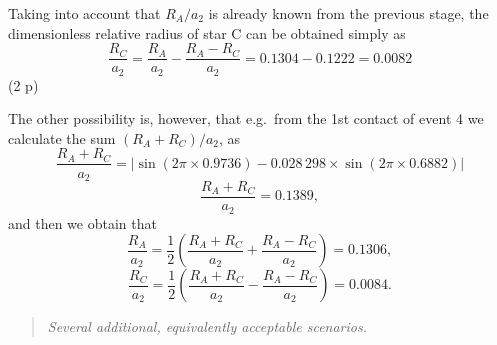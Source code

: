 \begin{description}
\begin{description}
    Taking into account that $R_A/a_2$ is already known from the previous
    stage, the dimensionless relative radius of star C can be obtained
    simply as
    \[ \frac{R_C}{a_2} = \frac{R_A}{a_2} - \frac{R_A - R_C}{a_2}
       = 0.1304 - 0.1222 = 0.0082
       \tag*{(2.22)} \]
    \hfill(2 p)

    The other possibility is, however, that e.g.\ from the 1st contact of
    event 4 we calculate the sum $(R_A + R_C)/a_2$, as
    \[ \frac{R_A + R_C}{a_2}
       = \left| \sin(2\pi \times 0.9736)
       - 0.028\,298 \times \sin(2\pi \times 0.6882) \right|
       \tag*{(2.23)} \]
    \[ \frac{R_A + R_C}{a_2} = 0.1389,
       \tag*{(2.24)} \]
    and then we obtain that
    \[ \frac{R_A}{a_2} = \frac{1}{2}\left( \frac{R_A + R_C}{a_2}
       + \frac{R_A - R_C}{a_2} \right) = 0.1306,
       \tag*{(2.25)} \]
    \[ \frac{R_C}{a_2} = \frac{1}{2}\left( \frac{R_A + R_C}{a_2}
       - \frac{R_A - R_C}{a_2} \right) = 0.0084.
       \tag*{(2.26)} \]

    \begin{quote}
    \emph{Several additional, equivalently acceptable scenarios.}


\end{quote}
\end{description}
\end{description}
